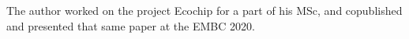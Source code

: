 The author worked on the project Ecochip for a part of his MSc, and copublished \citep{das2020ecochip} and presented that same paper at the EMBC 2020. 